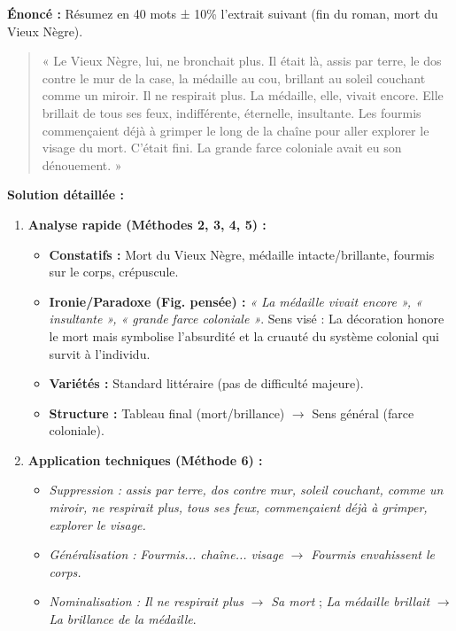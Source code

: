\documentclass[11pt]{article}
\begin{document}
\begin{exoresolu}
\textbf{Énoncé :} Résumez en 40 mots ± 10\% l'extrait suivant (fin du roman, mort du Vieux Nègre).
\begin{quote}
« Le Vieux Nègre, lui, ne bronchait plus. Il était là, assis par terre, le dos contre le mur de la case, la médaille au cou, brillant au soleil couchant comme un miroir. Il ne respirait plus. La médaille, elle, vivait encore. Elle brillait de tous ses feux, indifférente, éternelle, insultante. Les fourmis commençaient déjà à grimper le long de la chaîne pour aller explorer le visage du mort. C'était fini. La grande farce coloniale avait eu son dénouement. »
\end{quote}
\tcblower
\textbf{Solution détaillée :}
\begin{enumerate}
    \item \textbf{Analyse rapide (Méthodes 2, 3, 4, 5) :}
    \begin{itemize}
        \item \textbf{Constatifs :} Mort du Vieux Nègre, médaille intacte/brillante, fourmis sur le corps, crépuscule.
        \item \textbf{Ironie/Paradoxe (Fig. pensée) :} \emph{« La médaille vivait encore », « insultante », « grande farce coloniale »}. Sens visé : La décoration honore le mort mais symbolise l'absurdité et la cruauté du système colonial qui survit à l'individu.
        \item \textbf{Variétés :} Standard littéraire (pas de difficulté majeure).
        \item \textbf{Structure :} Tableau final (mort/brillance) $\rightarrow$ Sens général (farce coloniale).
    \end{itemize}
    \item \textbf{Application techniques (Méthode 6) :}
    \begin{itemize}
        \item \emph{Suppression :} \emph{assis par terre, dos contre mur, soleil couchant, comme un miroir, ne respirait plus, tous ses feux, commençaient déjà à grimper, explorer le visage.}
        \item \emph{Généralisation :} \emph{Fourmis... chaîne... visage} $\rightarrow$ \emph{Fourmis envahissent le corps.}
        \item \emph{Nominalisation :} \emph{Il ne respirait plus} $\rightarrow$ \emph{Sa mort} ; \emph{La médaille brillait} $\rightarrow$ \emph{La brillance de la médaille}.

\end{itemize}
\end{enumerate}
\end{exoresolu}
\end{document}
